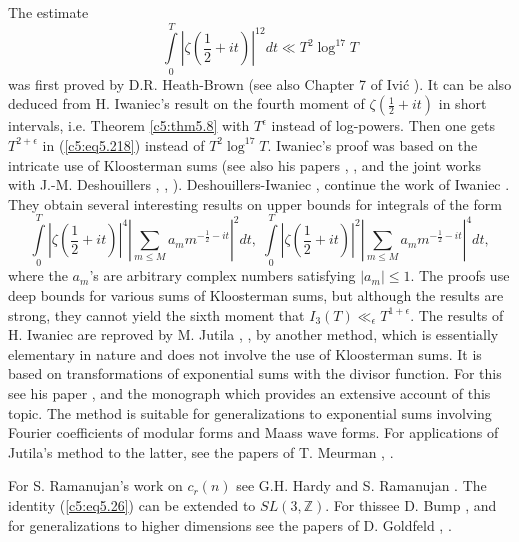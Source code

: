 The estimate
\begin{equation}
\int\limits^T_0 \left|\zeta\left(\frac{1}{2} + it\right)\right|^{12}
dt \ll T^2 \log^{17} T \label{c5:eq5.218} 
\end{equation}
was first proved by D.R. Heath-Brown \cite{Heath-Brown1} (see also
Chapter 7 of Ivi\'c \cite{Ivic1}). It can be also deduced from
H. Iwaniec's result \cite{Iwaniec1} on the fourth moment of
$\zeta(\frac{1}{2} + it)$ in short intervals, i.e. Theorem
\ref{c5:thm5.8} with $T^{\epsilon}$ instead of log-powers. Then one
gets $T^{2+\epsilon}$ in (\ref{c5:eq5.218}) instead of $T^2 \log^{17}
T$. Iwaniec's proof was based on the intricate use of Kloosterman sums
(see also his papers \cite{Iwaniec1}, \cite{Iwaniec3}, \cite{Iwaniec4}
and the joint works with J.-M. Deshouillers \cite{Deshouillers and
  Iwaniec1}, \cite{Deshouillers and Iwaniec3}, \cite{Deshouillers and
  Iwaniec4}). Deshouillers-Iwaniec \cite{Deshouillers and Iwaniec3},
\cite{Deshouillers and Iwaniec4} continue the work of Iwaniec
\cite{Iwaniec2}. They obtain several interesting results on upper
bounds for integrals of the form 
$$ 
\int\limits^T_0 \left|\zeta \left(\frac{1}{2} + it \right)\right|^4
\left|\sum\limits_{m \leq M} a_m m^{-\frac{1}{2} - it}\right|^2 dt, \;
\int\limits^T_0 \left|\zeta \left(\frac{1}{2} + it \right)\right|^2
\left|\sum\limits_{m \leq M} a_m m^{-\frac{1}{2} - it}\right|^4 dt,  
$$ 
where the $a_m$'s are arbitrary complex numbers satisfying $|a_m| \leq
1$. The proofs use deep bounds for various sums of Kloosterman sums,
but although the results are strong, they cannot yield the sixth
moment that $I_3 (T) \ll_{\epsilon} T^{1+\epsilon}$. The results of
H. Iwaniec \cite{Iwaniec1} are reproved by M. Jutila \cite{Jutila10},
\cite{Jutila11}, \cite{Jutila12} by another method, which is
essentially elementary in nature and does not involve the use of
Kloosterman sums. It is based on transformations of exponential sums
with the divisor function. For this see his paper \cite{Jutila3}, and
the monograph \cite{Jutila9} which provides an extensive account of
this topic. The method is suitable for generalizations to exponential
sums involving Fourier coefficients of modular forms and Maass wave
forms. For applications of Jutila's method to the latter, see the
papers of T. Meurman \cite{Meurman4}, \cite{Meurman6}. 

For S. Ramanujan's work on $c_r(n)$ see G.H. Hardy \cite{Hardy1} and
S. Ramanujan \cite{Ramanujan1}. The identity (\ref{c5:eq5.26}) can be
extended to $SL(3,\mathbb{Z})$. For this\pageoriginale see D. Bump
\cite{Bump1}, and for generalizations to higher dimensions see the
papers of D. Goldfeld \cite{Goldfeld1}, \cite{Goldfeld2}. 

